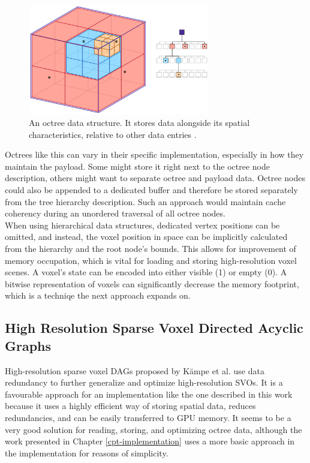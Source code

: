 \begin{figure}[h]
    \centering
    \includegraphics[width=300px]{images/graphics/octree.jpg}
    \caption{An octree data structure. It stores data alongside its spatial characteristics, relative to 
    other data entries \cite{Six2021}.}
    \label{fig:octree}
\end{figure}

\noindent
Octrees like this can vary in their specific implementation, especially in how they maintain the 
payload. Some might store it right next to the octree node description, others might want to separate 
octree and payload data. Octree nodes could also be appended to a dedicated buffer and therefore 
be stored separately from the tree hierarchy description. Such an approach would maintain cache 
coherency during an unordered traversal of all octree nodes.\\

\noindent
When using hierarchical data structures, dedicated vertex positions can be omitted, and instead, 
the voxel position in space can be implicitly calculated from the hierarchy and the root node's bounds. 
This allows for improvement of memory occupation, which is vital for loading and storing high-resolution 
voxel scenes. A voxel's state can be encoded into either visible (1) or empty (0). A bitwise representation 
of voxels can significantly decrease the memory footprint, which is a techniqe the next approach expands on.

\subsection*{High Resolution Sparse Voxel Directed Acyclic Graphs} \label{subsec-highres-svo-dags}

High-resolution sparse voxel \ac{DAG}s proposed by Kämpe et al. \cite{Kampe2013} use data redundancy to further 
generalize and optimize high-resolution \ac{SVO}s. It is a favourable approach for an implementation like 
the one described in this work because it uses a highly efficient way of storing spatial data, reduces redundancies, 
and can be easily transferred to \ac{GPU} memory. It seems to be a very good solution for reading, storing, and 
optimizing octree data, although the work presented in Chapter \ref{cpt-implementation} uses a more basic 
approach in the implementation for reasons of simplicity. 


